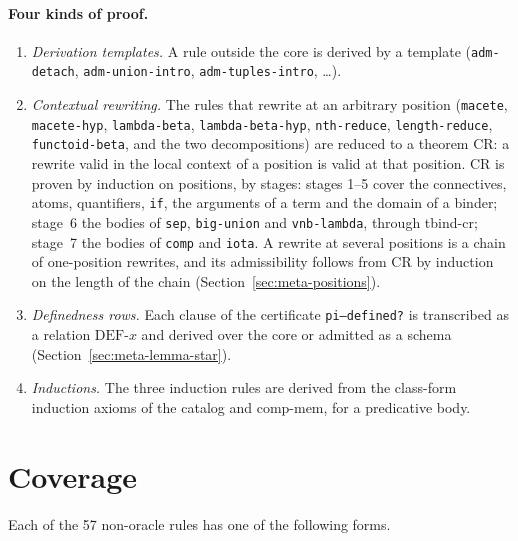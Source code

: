 \paragraph{Four kinds of proof.}
\begin{enumerate}
\item \emph{Derivation templates.}  A rule outside the core is derived
  by a template (\texttt{adm-detach}, \texttt{adm-union-intro},
  \texttt{adm-tuples-intro}, \ldots).
\item \emph{Contextual rewriting.}  The rules that rewrite at an
  arbitrary position (\texttt{macete}, \texttt{macete-hyp},
  \texttt{lambda-beta}, \texttt{lambda-beta-hyp}, \texttt{nth-reduce},
  \texttt{length-reduce}, \texttt{functoid-beta}, and the two
  decompositions) are reduced to a theorem CR: a rewrite valid in the
  local context of a position is valid at that position.  CR is proven by
  induction on positions, by stages: stages 1--5 cover the connectives,
  atoms, quantifiers, \texttt{if}, the arguments of a term and the domain
  of a binder; stage~6 the bodies of \texttt{sep}, \texttt{big-union} and
  \texttt{vnb-lambda}, through tbind-cr; stage~7 the bodies of
  \texttt{comp} and \texttt{iota}.  A rewrite at several positions is a
  chain of one-position rewrites, and its admissibility follows from CR
  by induction on the length of the chain
  (Section~\ref{sec:meta-positions}).
\item \emph{Definedness rows.}  Each clause of the certificate
  \texttt{pi--defined?} is transcribed as a relation
  $\mathrm{DEF\text{-}}x$ and derived over the core or admitted as a
  schema (Section~\ref{sec:meta-lemma-star}).
\item \emph{Inductions.}  The three induction rules are derived from the
  class-form induction axioms of the catalog and comp-mem, for a
  predicative body.
\end{enumerate}

\section{Coverage}\label{sec:meta-coverage}

Each of the 57 non-oracle rules has one of the following forms.

